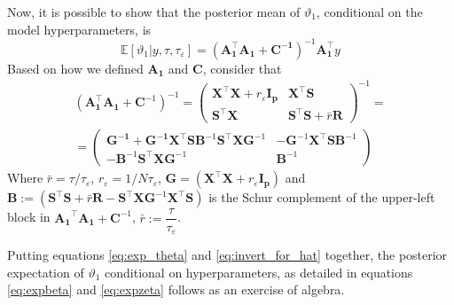 \documentclass[openany, 11pt, oneside]{book}
\begin{document}
\begin{subappendices}
Now, it is possible to show \parencite{LindleySmith} that the posterior mean of $\vartheta_1$, conditional on the model hyperparameters, is
%
\begin{equation}
\mathbb{E}[\vartheta_1 \vert y, \tau, \tau_{\varepsilon}] =
\left( \boldsymbol{A_{1}^{\top}A_{1}} + \boldsymbol{C^{-1}} \right)^{-1}\boldsymbol{A_{1}^{\top}}y
\label{eq:exp_theta}
\end{equation}
%
Based on how we defined $\boldsymbol{A_1}$ and $\boldsymbol{C}$, consider that
\begin{equation}
\begin{aligned}
\left( \boldsymbol{A_{1}^{\top}A_{1}} + \boldsymbol{C}^{-1} \right)^{-1} = 
\begin{pmatrix}
 \boldsymbol{X ^\top X} + r_{\varepsilon} \boldsymbol{I_p} & \boldsymbol{X}^{\top} \boldsymbol{S} \\
 \boldsymbol{S} ^{\top} \boldsymbol{X} & \boldsymbol{S}^{\top} \boldsymbol{S} + \bar{r} \boldsymbol{R}
\end{pmatrix}^{-1} = \\ = 
\begin{pmatrix}
\boldsymbol{G^{-1}} + \boldsymbol{G^{-1}} \boldsymbol{X}^{\top} \boldsymbol{S} \boldsymbol{B}^{-1} \boldsymbol{S} ^{\top} \boldsymbol{XG}^{-1} & 
-\boldsymbol{G}^{-1} \boldsymbol{X}^{\top} \boldsymbol{S} \boldsymbol{B}^{-1}\\
-  \boldsymbol{B}^{-1} \boldsymbol{S}^{\top} \boldsymbol{X G}^{-1} & 
 \boldsymbol{B}^{-1}
\end{pmatrix}
\end{aligned}
\label{eq:invert_for_hat}
\end{equation}
%
Where $\bar{r} = \tau/\tau_\varepsilon$, $r_\varepsilon = 1/N \tau_\varepsilon$, $\boldsymbol{G} = \left( \boldsymbol{X ^ \top X} + r_\varepsilon \boldsymbol{I_p} \right)$ and $\boldsymbol{B} := (\boldsymbol{S} ^{\top} \boldsymbol{S} + \bar{r} \boldsymbol{R} - \boldsymbol{S} ^{\top} \boldsymbol{X G}^{-1} \boldsymbol{X}^{\top}\boldsymbol{S})$ is the Schur complement \parencite[][paragraph 0.7.3]{HornJohnson} of the upper-left block in $\boldsymbol{A_1}^\top \boldsymbol{A_1} + \boldsymbol{C}^{-1} $, $\bar{r} := \dfrac{\tau}{\tau_{\varepsilon}}$.

Putting equations \ref{eq:exp_theta} and \ref{eq:invert_for_hat} together, the posterior expectation of $\vartheta_1$ conditional on hyperparameters, as detailed in equations \ref{eq:expbeta} and \ref{eq:expzeta} follows as an exercise of algebra. 


\end{subappendices}
\end{document}
